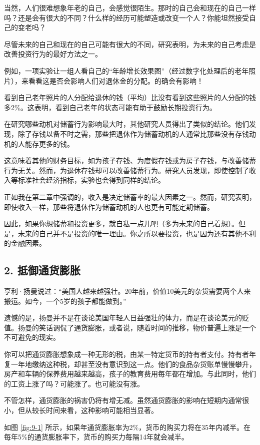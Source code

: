 当然，人们很难想象年老的自己，会感觉很陌生。那时的自己会和现在的自己一样吗？还是会有很大的不同？什么样的经历可能塑造或改变一个人？你能坦然接受自己的变老吗？

尽管未来的自己和现在的自己可能有很大的不同，研究表明，为未来的自己考虑是改善投资行为的最好方法之一。

例如，一项实验让一组人看自己的“年龄增长效果图”（经过数字化处理后的老年照片），来看看这是否会影响人们对退休金的分配。的确会有影响！

看到自己老年照片的人分配给退休的钱（平均）比没有看到这些照片的人分配的钱多2\%。这表明，看到自己老年的状态可能有助于鼓励长期投资行为。

在研究哪些动机对储蓄行为影响最大时，其他研究人员得出了类似的结论。他们发现，除了存钱以备不时之需，那些把退休作为储蓄动机的人通常比那些没有存钱动机的人能存更多的钱。

这意味着其他的财务目标，如为孩子存钱、为度假存钱或为房子存钱，与改善储蓄行为无关。然而，为退休存钱却可以改善储蓄行为。研究人员发现，即使控制了收入等标准社会经济指标，实验也会得到同样的结论。

正如我在第二章中强调的，收入是决定储蓄率的最大因素之一。然而，研究表明，即使收入一样，那些将退休作为储蓄动机的人也更有可能定期储蓄。

因此，如果你想储蓄和投资更多，就自私一点儿吧（多为未来的自己着想）。但是，未来的自己并不是投资的唯一理由。你之所以要投资，也是因为还有其他不利的金融因素。

\subsection{2. 抵御通货膨胀}
亨利·扬曼说过：“美国人越来越强壮。20年前，价值10美元的杂货需要两个人来搬运。如今，一个5岁的孩子都能做到。”

遗憾的是，扬曼并不是在谈论美国年轻人日益强壮的体力，而是在谈论美元的贬值。扬曼的笑话调侃了通货膨胀，或者说，随着时间的推移，物价普遍上涨是一个不可避免的现实。

你可以把通货膨胀想象成一种无形的税，由某一特定货币的持有者支付。持有者年复一年地缴纳这种税，却甚至没有意识到这一点。他们的食品杂货账单慢慢攀升，房产和车辆的保养费用越来越高，孩子的教育费用每年都在增加。与此同时，他们的工资上涨了吗？可能涨了。也可能没有涨。

不管怎样，通货膨胀的祸害仍将有增无减。虽然通货膨胀的影响在短期内通常很小，但从较长时间来看，这种影响可能相当显著。

如图 \ref{fig:9-1} 所示，如果年通货膨胀率为2\%，货币的购买力将在35年内减半。在每年5\%的通货膨胀率下，货币的购买力每隔14年就会减半。

